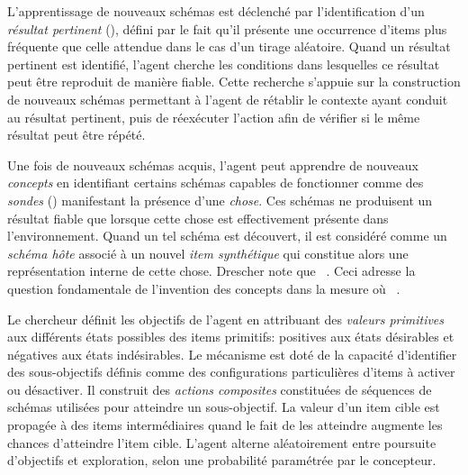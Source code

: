 L'apprentissage de nouveaux schémas est déclenché par l'identification d'un \textit{résultat pertinent} (), défini par le fait qu'il présente une occurrence d'items plus fréquente que celle attendue dans le cas d'un tirage aléatoire. 
Quand un résultat pertinent est identifié, l'agent cherche les conditions dans lesquelles ce résultat peut être reproduit de manière fiable.
Cette recherche s’appuie sur la construction de nouveaux schémas permettant à l’agent de rétablir le contexte ayant conduit au résultat pertinent, puis de réexécuter l’action afin de vérifier si le même résultat peut être répété. 

Une fois de nouveaux schémas acquis, l'agent peut apprendre de nouveaux \emph{concepts} en identifiant certains schémas capables de fonctionner comme des \emph{sondes} () manifestant la présence d'une \emph{chose}.
Ces schémas ne produisent un résultat fiable que lorsque cette chose est effectivement présente dans l'environnement. 
Quand un tel schéma est découvert, il est considéré comme un \emph{schéma hôte} associé à un nouvel \emph{item synthétique} qui constitue alors une représentation interne de cette chose.
Drescher note que \og {} \fg\ \cite[p.~83]{drescher_made-up_1991}.
Ceci adresse la question fondamentale de l'invention des concepts dans la mesure où \og {} \fg\ \cite[p.~81]{drescher_made-up_1991}. 

Le chercheur définit les objectifs de l'agent en attribuant des \emph{valeurs primitives} aux différents états possibles des items primitifs: positives aux états désirables et négatives aux états indésirables.
Le mécanisme est doté de la capacité d'identifier des sous-objectifs définis comme des configurations particulières d'items à activer ou désactiver. 
Il construit des \emph{actions composites} constituées de séquences de schémas utilisées pour atteindre un sous-objectif. 
La valeur d'un item cible est propagée à des items intermédiaires quand le fait de les atteindre augmente les chances d'atteindre l'item cible.
L'agent alterne aléatoirement entre poursuite d'objectifs et exploration, selon une probabilité paramétrée par le concepteur.

